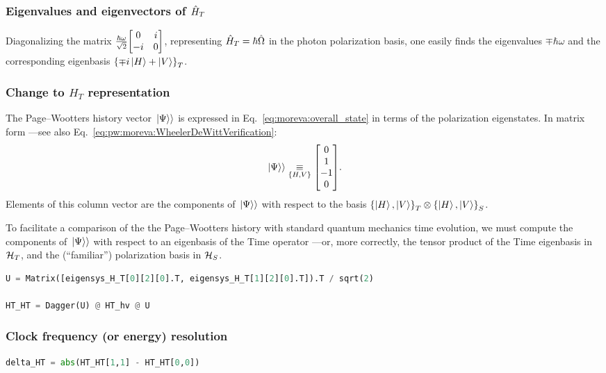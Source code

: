\subsubsection*{Eigenvalues and eigenvectors of $\hat{H}_T$}

Diagonalizing the matrix $\frac{\hbar\omega}{\sqrt{2}}\mqty[0 &i\\-i &0]$,
representing $\hat{H}_T = \hbar\hat{\Omega}$ in the photon polarization basis,
one easily finds the eigenvalues $\mp\hbar\omega$ and the corresponding eigenbasis 
$\left\{\mp i \ket{H} + \ket{V}\right\}_T$.

\subsubsection*{Change to $H_T$ representation}

The Page--Wootters history vector $\left.\left| \Psi \right\rangle\right\rangle$ is expressed in Eq.~\eqref{eq:moreva:overall_state}
in terms of the polarization eigenstates. In matrix form ---see also Eq.~\eqref{eq:pw:moreva:WheelerDeWittVerification}:
\begin{equation}
  \dket{\Psi} \repr[\setof{H, V}] \mqty[0 \\ 1 \\ -1 \\ 0] \text{.}
\end{equation}
Elements of this column vector are the components of $\left.\left| \Psi \right\rangle\right\rangle$
with respect to the basis $\left\{\ket{H}, \ket{V}\right\}_T \otimes \left\{\ket{H}, \ket{V}\right\}_S$.

To facilitate a comparison of the the Page--Wootters history with standard quantum mechanics time evolution,
we must compute the components of $\left.\left| \Psi \right\rangle\right\rangle$ with respect to an eigenbasis of the Time operator
---or, more correctly, the tensor product of the Time eigenbasis in $\mathcal{H}_T$,
and the (``familiar'') polarization basis in $\mathcal{H}_S$.  

\begin{lstlisting}[language=Python]
U = Matrix([eigensys_H_T[0][2][0].T, eigensys_H_T[1][2][0].T]).T / sqrt(2)

HT_HT = Dagger(U) @ HT_hv @ U
\end{lstlisting}

\subsubsection*{Clock frequency (or energy) resolution}

\begin{lstlisting}[language=Python]
delta_HT = abs(HT_HT[1,1] - HT_HT[0,0])
\end{lstlisting}

